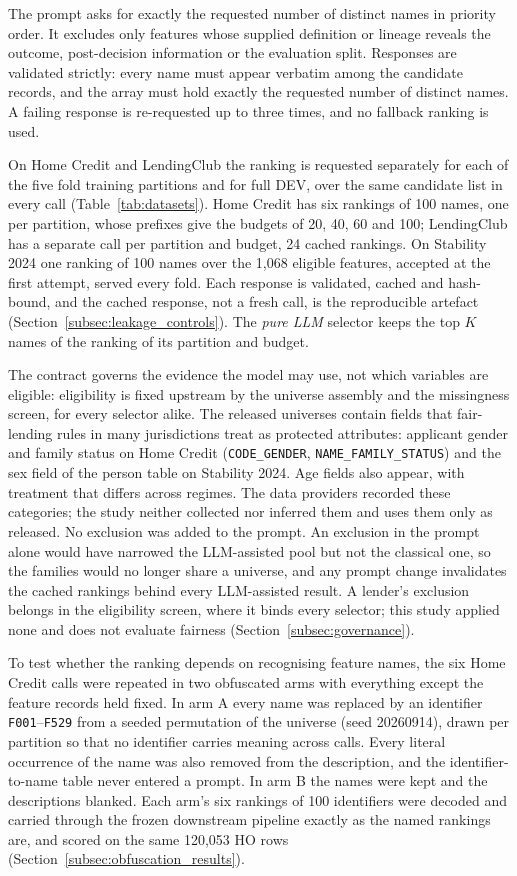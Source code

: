 \documentclass[final,5p,twocolumn]{elsarticle}
\newcommand{\Kfeat}{K}
\begin{document}
The prompt asks for exactly the requested number of distinct names in priority order. It excludes only features whose supplied definition or lineage reveals the outcome, post-decision information or the evaluation split. Responses are validated strictly: every name must appear verbatim among the candidate records, and the array must hold exactly the requested number of distinct names. A failing response is re-requested up to three times, and no fallback ranking is used.

On Home Credit and LendingClub the ranking is requested separately for each of the five fold training partitions and for full DEV, over the same candidate list in every call (Table~\ref{tab:datasets}). Home Credit has six rankings of 100 names, one per partition, whose prefixes give the budgets of 20, 40, 60 and 100; LendingClub has a separate call per partition and budget, 24 cached rankings. On Stability 2024 one ranking of 100 names over the 1,068 eligible features, accepted at the first attempt, served every fold. Each response is validated, cached and hash-bound, and the cached response, not a fresh call, is the reproducible artefact (Section~\ref{subsec:leakage_controls}). The \emph{pure LLM} selector keeps the top $\Kfeat$ names of the ranking of its partition and budget.

The contract governs the evidence the model may use, not which variables are eligible: eligibility is fixed upstream by the universe assembly and the missingness screen, for every selector alike. The released universes contain fields that fair-lending rules in many jurisdictions treat as protected attributes: applicant gender and family status on Home Credit (\texttt{CODE\_GENDER}, \texttt{NAME\_FAMILY\_STATUS}) and the sex field of the person table on Stability 2024. Age fields also appear, with treatment that differs across regimes. The data providers recorded these categories; the study neither collected nor inferred them and uses them only as released. No exclusion was added to the prompt. An exclusion in the prompt alone would have narrowed the LLM-assisted pool but not the classical one, so the families would no longer share a universe, and any prompt change invalidates the cached rankings behind every LLM-assisted result. A lender's exclusion belongs in the eligibility screen, where it binds every selector; this study applied none and does not evaluate fairness (Section~\ref{subsec:governance}).

To test whether the ranking depends on recognising feature names, the six Home Credit calls were repeated in two obfuscated arms with everything except the feature records held fixed. In arm A every name was replaced by an identifier \texttt{F001}--\texttt{F529} from a seeded permutation of the universe (seed 20260914), drawn per partition so that no identifier carries meaning across calls. Every literal occurrence of the name was also removed from the description, and the identifier-to-name table never entered a prompt. In arm B the names were kept and the descriptions blanked. Each arm's six rankings of 100 identifiers were decoded and carried through the frozen downstream pipeline exactly as the named rankings are, and scored on the same 120,053 HO rows (Section~\ref{subsec:obfuscation_results}).
\end{document}
